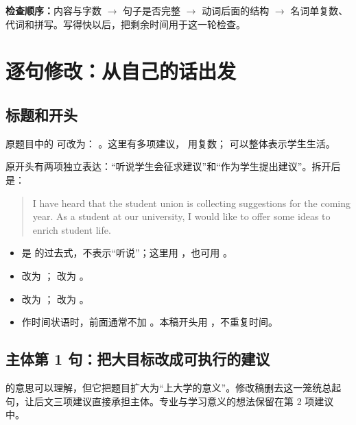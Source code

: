 \textbf{检查顺序：}内容与字数 $\rightarrow$ 句子是否完整 $\rightarrow$ 动词后面的结构 $\rightarrow$ 名词单复数、代词和拼写。写得快以后，把剩余时间用于这一轮检查。

\newpage
\section{逐句修改：从自己的话出发}
\subsection{标题和开头}
原题目中的  可改为：
。这里有多项建议， 用复数； 可以整体表示学生生活。

原开头有两项独立表达：“听说学生会征求建议”和“作为学生提出建议”。拆开后是：
\begin{quote}
I have heard that the student union is collecting suggestions for the coming year. As a student at our university, I would like to offer some ideas to enrich student life.
\end{quote}
\begin{itemize}
\item {} 是  的过去式，不表示“听说”；这里用 ，也可用 。
\item {} 改为 ； 改为 。
\item {} 改为 ； 改为 。
\item {} 作时间状语时，前面通常不加 。本稿开头用 ，不重复时间。
\end{itemize}

\subsection{主体第 1 句：把大目标改成可执行的建议}
 的意思可以理解，但它把题目扩大为“上大学的意义”。修改稿删去这一笼统总起句，让后文三项建议直接承担主体。专业与学习意义的想法保留在第 2 项建议中。

